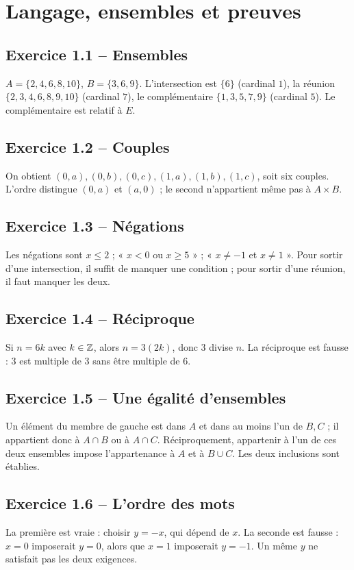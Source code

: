 \chapter{Langage, ensembles et preuves}
\section*{Exercice 1.1 -- Ensembles}
$A=\{2,4,6,8,10\}$, $B=\{3,6,9\}$. L'intersection est $\{6\}$ (cardinal $1$), la réunion $\{2,3,4,6,8,9,10\}$ (cardinal $7$), le complémentaire $\{1,3,5,7,9\}$ (cardinal $5$). Le complémentaire est relatif à $E$.

\section*{Exercice 1.2 -- Couples}
On obtient $(0,a),(0,b),(0,c),(1,a),(1,b),(1,c)$, soit six couples. L'ordre distingue $(0,a)$ et $(a,0)$ ; le second n'appartient même pas à $A\times B$.

\section*{Exercice 1.3 -- Négations}
Les négations sont $x\leq2$ ; « $x<0$ ou $x\geq5$ » ; « $x\ne-1$ et $x\ne1$ ». Pour sortir d'une intersection, il suffit de manquer une condition ; pour sortir d'une réunion, il faut manquer les deux.

\section*{Exercice 1.4 -- Réciproque}
Si $n=6k$ avec $k\in\mathbb{Z}$, alors $n=3(2k)$, donc $3$ divise $n$. La réciproque est fausse : $3$ est multiple de $3$ sans être multiple de $6$.

\section*{Exercice 1.5 -- Une égalité d'ensembles}
Un élément du membre de gauche est dans $A$ et dans au moins l'un de $B,C$ ; il appartient donc à $A\cap B$ ou à $A\cap C$. Réciproquement, appartenir à l'un de ces deux ensembles impose l'appartenance à $A$ et à $B\cup C$. Les deux inclusions sont établies.

\section*{Exercice 1.6 -- L'ordre des mots}
La première est vraie : choisir $y=-x$, qui dépend de $x$. La seconde est fausse : $x=0$ imposerait $y=0$, alors que $x=1$ imposerait $y=-1$. Un même $y$ ne satisfait pas les deux exigences.
